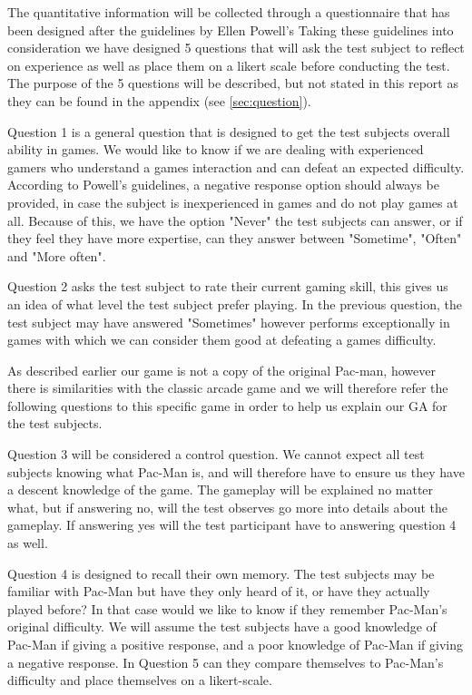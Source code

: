 The quantitative information will be collected through a questionnaire that has been designed after the guidelines by Ellen Powell's  \cite{Taylor-Powell1998} Taking these guidelines into consideration we have designed 5 questions that will ask the test subject to reflect on experience as well as place them on a likert scale before conducting the test. The purpose of the 5 questions will be described, but not stated in this report as they can be found in the appendix (see \ref{sec:question}).

Question 1 is a general question that is designed to get the test subjects overall ability in games. We would like to know if we are dealing with experienced gamers who understand a games interaction and can defeat an expected difficulty. According to Powell's guidelines, a negative response option should always be provided, in case the subject is inexperienced in games and do not play games at all. Because of this, we have the option "Never" the test subjects can answer, or if they feel they have more expertise, can they answer between "Sometime", "Often" and "More often".

Question 2 asks the test subject to rate their current gaming skill, this gives us an idea of what level the test subject prefer playing. In the previous question, the test subject may have answered "Sometimes" however performs exceptionally in games with which we can consider them good at defeating a games difficulty.

As described earlier our game is not a copy of the original Pac-man, however there is similarities with the classic arcade game and we will therefore refer the following questions to this specific game in order to help us explain our GA for the test subjects.

Question 3 will be considered a control question. We cannot expect all test subjects knowing what Pac-Man is, and will therefore have to ensure us they have a descent knowledge of the game. The gameplay will be explained no matter what, but if answering no, will the test observes go more into details about the gameplay. If answering yes will the test participant have to answering question 4 as well.

Question 4 is designed to recall their own memory. The test subjects may be familiar with Pac-Man but have they only heard of it, or have they actually played before? In that case would we like to know if they remember Pac-Man's original difficulty. We will assume the test subjects have a good knowledge of Pac-Man if giving a positive response, and a poor knowledge of Pac-Man if giving a negative response. In Question 5 can they compare themselves to Pac-Man's difficulty and place themselves on a likert-scale.

